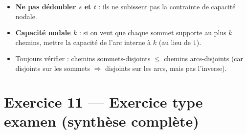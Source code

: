 \documentclass[12pt,a4paper]{article}
\begin{document}
\begin{attention}
\begin{itemize}
    \item \textbf{Ne pas d\'edoubler $s$ et $t$} : ils ne subissent pas la contrainte de capacit\'e nodale.
    \item \textbf{Capacit\'e nodale $k$} : si on veut que chaque sommet supporte au plus $k$ chemins, mettre la capacit\'e de l'arc interne \`a $k$ (au lieu de $1$).
    \item Toujours v\'erifier : chemins sommets-disjoints $\leq$ chemins arcs-disjoints (car disjoints sur les sommets $\Rightarrow$ disjoints sur les arcs, mais pas l'inverse).
\end{itemize}
\end{attention}


\newpage
\section{Exercice 11 --- Exercice type examen (synth\`ese compl\`ete)}
\end{document}
